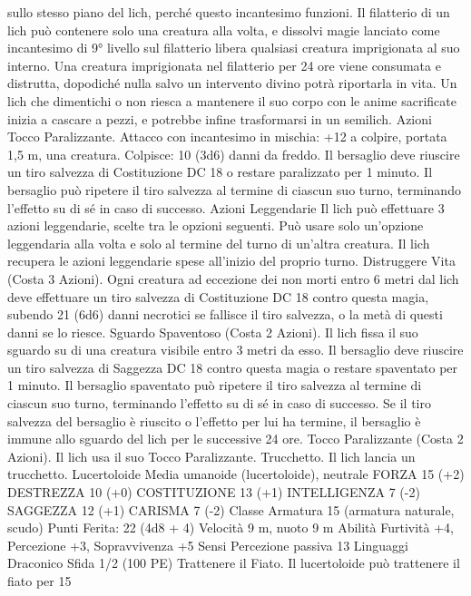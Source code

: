 \begin{multicols}{2}
sullo stesso piano del lich, perché questo incantesimo funzioni. Il
filatterio di un lich può contenere solo una creatura alla volta, e
dissolvi magie lanciato come incantesimo di 9° livello sul
filatterio libera qualsiasi creatura imprigionata al suo interno.
Una creatura imprigionata nel filatterio per 24 ore viene
consumata e distrutta, dopodiché nulla salvo un intervento divino
potrà riportarla in vita.
Un lich che dimentichi o non riesca a mantenere il suo corpo con
le anime sacrificate inizia a cascare a pezzi, e potrebbe infine
trasformarsi in un semilich.
Azioni
Tocco Paralizzante. Attacco con incantesimo in mischia: +12 a
colpire, portata 1,5 m, una creatura.
Colpisce: 10 (3d6) danni da freddo. Il bersaglio deve riuscire un
tiro salvezza di Costituzione DC 18 o restare paralizzato per 1
minuto. Il bersaglio può ripetere il tiro salvezza al termine di
ciascun suo turno, terminando l’effetto su di sé in caso di
successo.
Azioni Leggendarie
Il lich può effettuare 3 azioni leggendarie, scelte tra le opzioni
seguenti. Può usare solo un’opzione leggendaria alla volta e solo
al termine del turno di un’altra creatura. Il lich recupera le azioni
leggendarie spese all’inizio del proprio turno.
Distruggere Vita (Costa 3 Azioni). Ogni creatura ad eccezione
dei non morti entro 6 metri dal lich deve effettuare un tiro
salvezza di Costituzione DC 18 contro questa magia, subendo 21
(6d6) danni necrotici se fallisce il tiro salvezza, o la metà di
questi danni se lo riesce.
Sguardo Spaventoso (Costa 2 Azioni). Il lich fissa il suo sguardo
su di una creatura visibile entro 3 metri da esso. Il bersaglio deve
riuscire un tiro salvezza di Saggezza DC 18 contro questa magia
o restare spaventato per 1 minuto. Il bersaglio spaventato può
ripetere il tiro salvezza al termine di ciascun suo turno,
terminando l’effetto su di sé in caso di successo. Se il tiro
salvezza del bersaglio è riuscito o l’effetto per lui ha termine, il
bersaglio è immune allo sguardo del lich per le successive 24
ore.
Tocco Paralizzante (Costa 2 Azioni). Il lich usa il suo Tocco
Paralizzante.
Trucchetto. Il lich lancia un trucchetto.
Lucertoloide
Media umanoide (lucertoloide), neutrale
FORZA 15 (+2)
DESTREZZA 10 (+0)
COSTITUZIONE 13 (+1)
INTELLIGENZA 7 (-2)
SAGGEZZA 12 (+1)
CARISMA 7 (-2)
Classe Armatura 15 (armatura naturale, scudo)
\hspace*{0pt}\hfill{Punti Ferita}: 22 (4d8 + 4)
Velocità 9 m, nuoto 9 m
Abilità Furtività +4, Percezione +3, Sopravvivenza +5
Sensi Percezione passiva 13
Linguaggi Draconico
Sfida 1/2 (100 PE)
Trattenere il Fiato. Il lucertoloide può trattenere il fiato per 15

\end{multicols}
